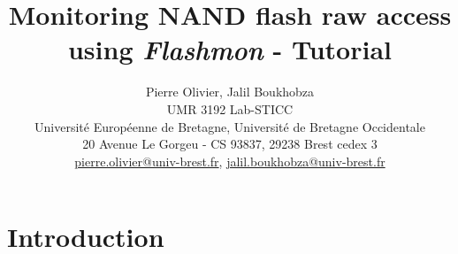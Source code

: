 \documentclass[11pt]{article}
\title{\textbf{Monitoring NAND flash raw access using \textit{Flashmon} - Tutorial}}
\author{Pierre Olivier, Jalil Boukhobza\\UMR 3192 Lab-STICC\\Universit\'e Europ\'eenne de Bretagne, Universit\'e de Bretagne Occidentale\\20 Avenue Le Gorgeu - CS 93837, 29238 Brest cedex 3\\\href{mailto:pierre.olivier@univ-brest.fr}{pierre.olivier@univ-brest.fr}, \href{mailto:jalil.boukhobza@univ-brest.fr}{jalil.boukhobza@univ-brest.fr}}
\date{}
\begin{document}
\VerbatimFootnotes

\maketitle

\section{Introduction}
\end{document}
